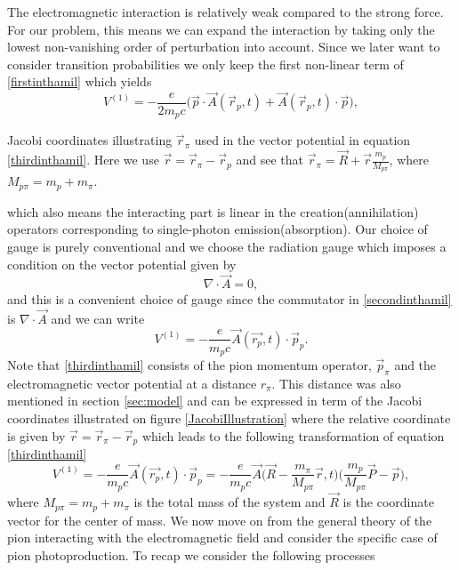 The electromagnetic interaction is relatively weak compared to the strong force. For our problem, this means we can expand the interaction by taking only the lowest non-vanishing order of perturbation into account. Since we later want to consider transition probabilities we only keep the first non-linear term of \eqref{firstinthamil} which yields
\begin{equation}\label{secondinthamil}
	V^{(1)} = -\frac{e}{2m_p c}\bigg( \vec{p}\cdot \vec{A}(\vec{r}_p,t)+\vec{A}(\vec{r}_p,t)\cdot \vec{p}\bigg),
\end{equation}
\begin{marginfigure}
	\centering
	
	\caption{Jacobi coordinates illustrating $\vec{r}_\pi$ used in the vector potential in equation \ref{thirdinthamil}. Here we use $\vec{r}=\vec{r}_\pi-\vec{r}_p$ and see that $\vec{r}_\pi = \vec{R}+\vec{r}\frac{m_p}{M_{p \pi}}$, where $M_{p\pi}=m_p+m_\pi$.}
	\label{JacobiIllustration}
\end{marginfigure}
\noindent which also means the interacting part is linear in the creation(annihilation) operators corresponding to single-photon emission(absorption). Our choice of gauge is purely conventional and we choose the radiation gauge which imposes a condition on the vector potential given by
\begin{equation}
	\nabla \cdot \vec{A} = 0,
\end{equation}
and this is a convenient choice of gauge since the commutator in \eqref{secondinthamil} is $\nabla \cdot \vec{A}$ and we can write
\begin{equation}\label{thirdinthamil}
	V^{(1)} = -\frac{e}{m_p c}\vec{A}(\vec{r_p},t)\cdot \vec{p}_p. 
\end{equation}
Note that \eqref{thirdinthamil} consists of the pion momentum operator, $\vec{p}_\pi$ and the electromagnetic vector potential at a distance $r_\pi$. This distance was also mentioned in section \ref{sec:model} and can be expressed in term of the Jacobi coordinates illustrated on figure \ref{JacobiIllustration} where the relative coordinate is given by $\vec{r}=\vec{r}_\pi-\vec{r}_p$ which leads to the following transformation of equation \eqref{thirdinthamil}
\begin{equation}
	V^{(1)} = -\frac{e}{m_p c}\vec{A}(\vec{r_p},t)\cdot \vec{p}_p = -\frac{e}{m_p c} \vec{A}\bigg( \vec{R}-\frac{m_\pi}{M_{p\pi}}\vec{r},t\bigg)\bigg(\frac{m_p}{M_{p\pi}}\vec{P}-\vec{p}\bigg),
\end{equation}
where $M_{p \pi}=m_p+m_\pi$ is the total mass of the system and $\vec{R}$ is the coordinate vector for the center of mass. We now move on from the general theory of the pion interacting with the electromagnetic field and consider the specific case of pion photoproduction. To recap we consider the following processes
